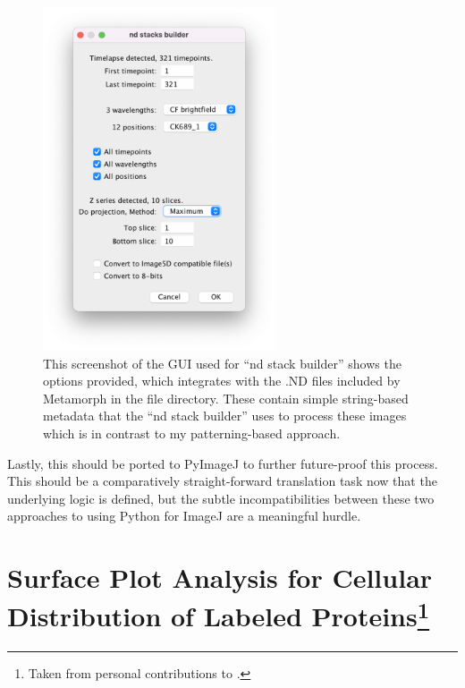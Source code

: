 \begin{figure}
\centering
\includegraphics[height=4in]{images/ndstackbuilder.png}
\caption[GUI for the existing ``nd stack builder'' script]{This screenshot of the GUI used for ``nd stack builder'' shows the options provided, which integrates with the .ND files included by Metamorph in the file directory. These contain simple string-based metadata that the ``nd stack builder'' uses to process these images which is in contrast to my patterning-based approach.}
\label{figure:ndstackbuilder}
\end{figure}

Lastly, this should be ported to PyImageJ to further future-proof this process. This should be a comparatively straight-forward translation task now that the underlying logic is defined, but the subtle incompatibilities between these two approaches to using Python for ImageJ are a meaningful hurdle.

\section[Surface Plot Analysis for Cellular Distribution of Labeled Proteins]{Surface Plot Analysis for Cellular Distribution of Labeled Proteins\footnote{Taken from personal contributions to .}}

